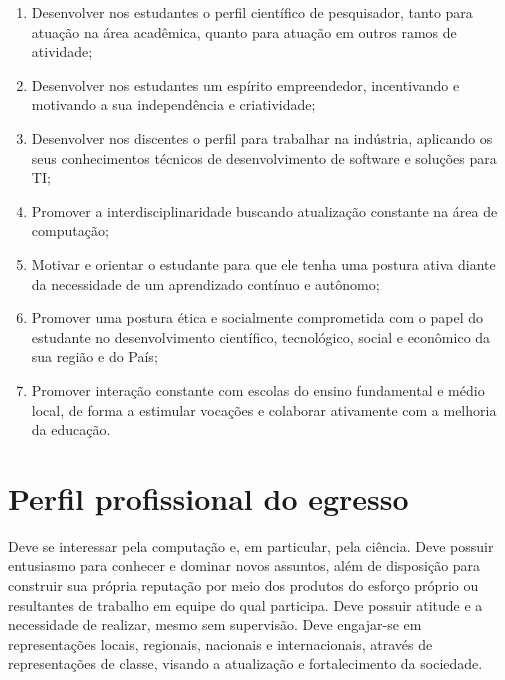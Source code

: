 \documentclass[
	12pt,				%
	openright,			%
  oneside,     %
	a4paper,			%
 hyphens,
	chapter=TITLE,		%
	english,			%
	french,				%
	spanish,			%
	brazil				%
	]{abntex2}
\begin{document}
\begin{enumerate}
    \item Desenvolver nos estudantes o perfil científico de pesquisador, tanto para atuação na área acadêmica, quanto para atuação em outros ramos de atividade;
    \item Desenvolver nos estudantes um espírito empreendedor, incentivando e motivando a sua independência e criatividade;
    \item Desenvolver nos discentes o perfil para trabalhar na indústria, aplicando os seus conhecimentos técnicos de desenvolvimento de software e soluções para TI;
    \item Promover a interdisciplinaridade buscando atualização constante na área de computação;
    \item Motivar e orientar o estudante para que ele tenha uma postura ativa diante da necessidade de um aprendizado contínuo e autônomo;
    \item Promover uma postura ética e socialmente comprometida com o papel do estudante no desenvolvimento científico, tecnológico, social e econômico da sua região e do País;
    \item Promover interação constante com escolas do ensino fundamental e médio local, de forma a estimular vocações e colaborar ativamente com a melhoria da educação.
    
\end{enumerate}




%
%



\chapter{Perfil profissional do egresso}
\label{cap_perfil_profissional_egresso}

Deve se interessar pela computação e, em particular, pela ciência. Deve possuir entusiasmo para conhecer e dominar novos assuntos, além de disposição para construir sua própria reputação por meio dos produtos do esforço próprio ou resultantes de trabalho em equipe do qual participa. Deve possuir atitude e a necessidade de realizar, mesmo sem supervisão. Deve engajar-se em representações locais, regionais, nacionais e internacionais, através de representações de classe, visando a atualização e fortalecimento da sociedade.
\end{document}
